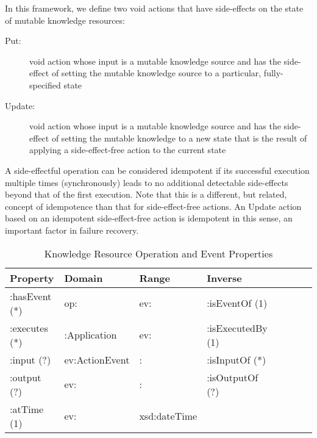\documentclass[runningheads]{llncs}
\begin{document}
In this framework, we define two void actions that have side-effects on the state of mutable knowledge resources:
  \begin{description}
    \item[Put:] void action whose input is a mutable knowledge source and has the side-effect of setting the mutable knowledge source to a particular, fully-specified state
    \item[Update:] void action whose input is a mutable knowledge source and has the side-effect of setting the mutable knowledge to a new state that is the result of applying a side-effect-free action to the current state
  \end{description}
  
  A side-effectful operation can be considered idempotent if its successful execution multiple times (synchronously) leads to no additional detectable side-effects beyond that of the first execution. Note that this is a different, but related, concept of idempotence than that for side-effect-free actions. An Update action based on an idempotent side-effect-free action is idempotent in this sense, an important factor in failure recovery.

\begin{table}[h]
\begin{tabular}{|l|l|l|l|l|l|l|l|}
\hline
\textbf{Property}  &\textbf{Domain}  & \textbf{Range}  & \textbf{Inverse}
\\ \hline
:hasEvent (*)      & op:               & ev:             & :isEventOf  (1)         \\ \hline
:executes (*)      & :Application      & ev:             & :isExecutedBy  (1)         \\ \hline
:input (?)         & ev:ActionEvent    &    :          & :isInputOf  (*)         \\ \hline
:output (?)        & ev:               &    :          & :isOutputOf  (?)         \\ \hline
:atTime (1)        & ev:               &    xsd:dateTime          &          \\ \hline
\end{tabular}
\caption{Knowledge Resource Operation and Event Properties}
\label{kropprop}
\end{table}
\end{document}

